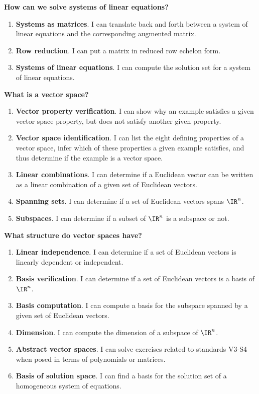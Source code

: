\noindent\textbf{How can we solve systems of linear equations?}
\begin{enumerate}
\setlength{\itemsep}{-0.02in}
\item {\bf Systems as matrices}. I can translate back and forth between a system of linear equations and the corresponding augmented matrix.
\item {\bf Row reduction}.  I can put a matrix in reduced row echelon form.
\item {\bf Systems of linear equations}. I can compute the solution set for a system of linear equations.
\end{enumerate}

\noindent\textbf{What is a vector space?}
\begin{enumerate}
\setlength{\itemsep}{-0.02in}
\item {\bf Vector property verification}. I can show why an example satisfies a given vector space property, but does not satisfy another given property.
\item {\bf Vector space identification}. I can list the eight defining properties of a vector space, infer which of these properties a given example satisfies, and thus determine if the example is a vector space.
\item {\bf Linear combinations}. I can determine if a Euclidean vector can be written as a linear combination of a given set of Euclidean vectors.
\item {\bf Spanning sets}. I can determine if a set of Euclidean vectors spans \(\IR^n\).
\item {\bf Subspaces}. I can determine if a subset of \(\IR^n\) is a subspace or not.

\end{enumerate}

\noindent\textbf{What structure do vector spaces have?}
\begin{enumerate}
\setlength{\itemsep}{-0.02in}

\item {\bf Linear independence}. I can determine if a set of Euclidean vectors is linearly dependent or independent.
\item {\bf Basis verification}. I can determine if a set of Euclidean vectors is a basis of \(\IR^n\).
\item {\bf Basis computation}.  I can compute a basis for the subspace spanned by a given set of Euclidean vectors.
\item {\bf Dimension}.  I can compute the dimension of a subspace of \(\IR^n\).
\item {\bf Abstract vector spaces}. I can solve exercises related to standards V3-S4 when posed in terms of polynomials or matrices.
\item {\bf Basis of solution space}. I can find a basis for the solution set of a homogeneous system of equations.
\end{enumerate}

